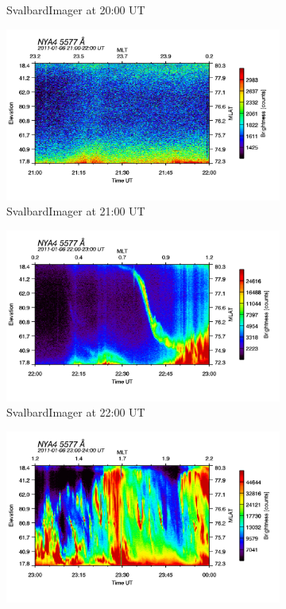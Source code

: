 \documentclass[10pt,a4paper]{article}
\begin{document}
\begin{figure}[h]
\begin{subfigure}{0.3\textwidth}
	\caption{ SvalbardImager at 20:00 UT \label{SBI_5_20}}
\end{subfigure}
\begin{subfigure}{0.3\textwidth}
\centering
	\includegraphics[width=\textwidth]{SvalbardImager5577A21.png}
	\caption{ SvalbardImager at 21:00 UT \label{SBI_5_21}}
\end{subfigure}
\begin{subfigure}{0.3\textwidth}
\centering
	\includegraphics[width=\textwidth]{SvalbardImager5577A22.png}
	\caption{ SvalbardImager at 22:00 UT \label{SBI_5_22}}
\end{subfigure}
\begin{subfigure}{0.3\textwidth}
\centering
	\includegraphics[width=\textwidth]{SvalbardImager5577A23.png}

\end{subfigure}
\end{figure}
\end{document}
